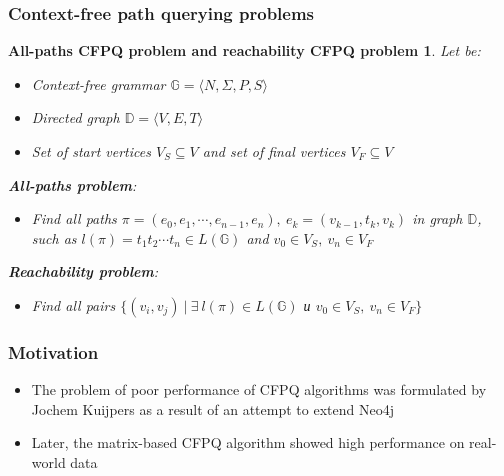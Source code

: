 \documentclass{beamer}
\newtheorem{task}{All-paths CFPQ problem and reachability CFPQ problem }
\begin{document}
\begin{frame}[fragile]
  \transwipe[direction=90]
  \frametitle{Context-free path querying problems}
   \begin{task}
  Let be:
     \begin{itemize}
    \item Context-free grammar $\mathbb{G}  = \langle N, \Sigma, P, S \rangle$
     \item Directed graph $ \mathbb{D} = \langle V, E, T \rangle$
     \item Set of start vertices $V_S \subseteq V$  and set of final vertices \mbox{$V_F \subseteq V$}
\end{itemize} 
\textbf{All-paths problem}:
\begin{itemize}
    \item Find all paths $\pi = (e_0, e_1, \cdots, e_{n - 1}, e_n), ~ e_k = (v_{k - 1}, t_k, v_k)$ in graph $ \mathbb{D}$, such as $l(\pi) = t_1t_2 \cdots t_n \in L(\mathbb{G})$ and $v_0 \in V_S, ~v_n \in V_F$
\end{itemize}
\textbf{Reachability problem}:
\begin{itemize}
    \item Find all pairs $\{(v_i, v_j ) ~|~ \exists ~l(\pi) \in L(\mathbb{G})$ и $v_0 \in V_S, ~v_n \in V_F\}$
\end{itemize}
 \end{task}
\end{frame}

\begin{frame}[fragile]
  \transwipe[direction=90]
  \frametitle{Motivation}
  \begin{itemize}
        \item The problem of poor performance of CFPQ algorithms was formulated by Jochem Kuijpers as a result of an attempt to extend Neo4j
      \item Later, the matrix-based CFPQ algorithm showed high performance on real-world data
  \end{itemize}
\end{frame}
\end{document}
